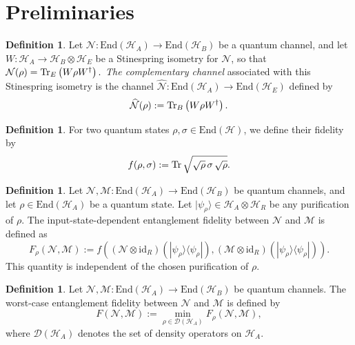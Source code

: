 \documentclass[11pt,letterpaper]{article}
\theoremstyle{plain}
\theoremstyle{plain}
\theoremstyle{plain}
\theoremstyle{plain}
\theoremstyle{plain}
\theoremstyle{plain}
\newcommand{\End}{\mathrm{End}}
\theoremstyle{plain}
\theoremstyle{definition}
\newtheorem{smdefinition}[smtheorem]{Definition}
\theoremstyle{plain}
\begin{document}
\section{Preliminaries}\label{sec:suppl_prelim}

\begin{smdefinition}\label{def:complementary_channel}
Let \(\mathcal N:\End(\mathcal H_A)\to \End(\mathcal H_B)\) be a quantum channel, and let
$
    W:\mathcal H_A\to \mathcal H_B\otimes \mathcal H_E
$
be a Stinespring isometry for \(\mathcal N\), so that
$
    \mathcal N(\rho)=\Tr_E\left(W\rho W^\dagger\right).
$
\textit{The complementary channel} associated with this Stinespring isometry is the channel
$
    \widehat{\mathcal N}:\End(\mathcal H_A)\to \End(\mathcal H_E)
$
defined by
$$
    \widehat{\mathcal N}(\rho)
    :=
    \Tr_B\left(W\rho W^\dagger\right).
$$
\end{smdefinition}

\begin{smdefinition}\label{def:root_fidelity}
For two quantum states \(\rho,\sigma\in \End(\mathcal H)\), we define their fidelity by
\[
    f(\rho,\sigma)
    :=
    \Tr\sqrt{\sqrt{\rho}\,\sigma\,\sqrt{\rho}}.
\]
\end{smdefinition}

\begin{smdefinition}\label{def:rho_entanglement_fidelity}
Let
$
    \mathcal N,\mathcal M:\End(\mathcal H_A)\to \End(\mathcal H_B)
$
be quantum channels, and let \(\rho\in\End(\mathcal H_A)\) be a quantum state. Let
$
    |\psi_\rho\rangle\in \mathcal H_A\otimes \mathcal H_R
$
be any purification of \(\rho\). The input-state-dependent entanglement fidelity between \(\mathcal N\) and \(\mathcal M\) is defined as
\[
    F_\rho(\mathcal N,\mathcal M)
    :=
    f\left(
    (\mathcal N\otimes \mathrm{id}_R)(|\psi_\rho\rangle\langle\psi_\rho|),
    (\mathcal M\otimes \mathrm{id}_R)(|\psi_\rho\rangle\langle\psi_\rho|)
    \right).
\]
This quantity is independent of the chosen purification of \(\rho\).
\end{smdefinition}

\begin{smdefinition}\label{def:worst_case_entanglement_fidelity}
Let
$
    \mathcal N,\mathcal M:\End(\mathcal H_A)\to \End(\mathcal H_B)
$
be quantum channels. The worst-case entanglement fidelity between \(\mathcal N\) and \(\mathcal M\) is defined by
\[
    F(\mathcal N,\mathcal M)
    :=
    \min_{\rho\in\mathcal D(\mathcal H_A)}
    F_\rho(\mathcal N,\mathcal M),
\]
where \(\mathcal D(\mathcal H_A)\) denotes the set of density operators on \(\mathcal H_A\).
\end{smdefinition}
\end{document}
